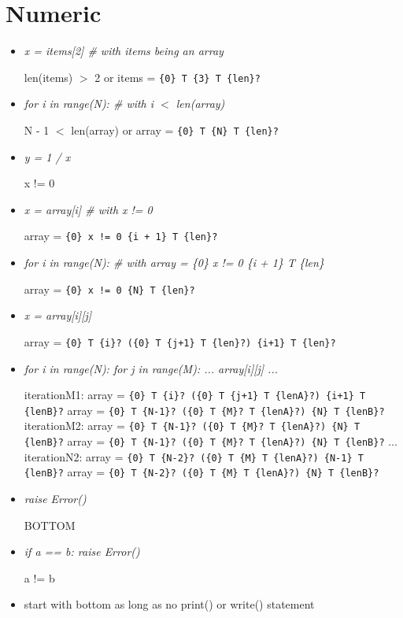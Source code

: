 \documentclass[11pt]{article}
\begin{document}

\section{Numeric}

\begin{itemize}
\item \textit{x = items[2] \# with items being an array}

len(items) $>$ 2 or items = \verb|{0} T {3} T {len}?|


\item \textit{for i in range(N): \# with i $<$ len(array)}

N - 1 $<$ len(array) or array = \verb|{0} T {N} T {len}?|


\item \textit{y = 1 / x}

x != 0


\item \textit{x = array[i] \# with x != 0}

array = \verb|{0} x != 0 {i + 1} T {len}?|


\item \textit{for i in range(N): \# with array = \{0\} x != 0 \{i + 1\} T \{len\}}

array = \verb|{0} x != 0 {N} T {len}?|


\item \textit{x = array[i][j]}

array = \verb|{0} T {i}? ({0} T {j+1} T {len}?) {i+1} T {len}?|


\item \textit{for i in range(N): for j in range(M): ... array[i][j] ...}

iterationM1: array = \verb|{0} T {i}? ({0} T {j+1} T {lenA}?) {i+1} T {lenB}?|
             array = \verb|{0} T {N-1}? ({0} T {M}? T {lenA}?) {N} T {lenB}?|
iterationM2: array = \verb|{0} T {N-1}? ({0} T {M}? T {lenA}?) {N} T {lenB}?|
             array = \verb|{0} T {N-1}? ({0} T {M}? T {lenA}?) {N} T {lenB}?|
...
iterationN2: array = \verb|{0} T {N-2}? ({0} T {M} T {lenA}?) {N-1} T {lenB}?|
             array = \verb|{0} T {N-2}? ({0} T {M} T {lenA}?) {N} T {lenB}?|

\item \textit{raise Error()}

BOTTOM


\item \textit{if a == b: raise Error()}

a != b


\item start with bottom as long as no print() or write() statement

\end{itemize}
\end{document}
